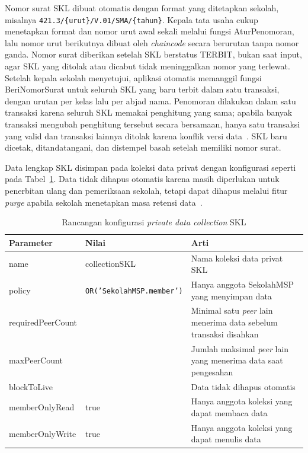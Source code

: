 Nomor surat SKL dibuat otomatis dengan format yang ditetapkan sekolah, misalnya \texttt{421.3/\{urut\}/V.01/SMA/\{tahun\}}. Kepala tata usaha cukup menetapkan format dan nomor urut awal sekali melalui fungsi AturPenomoran, lalu nomor urut berikutnya dibuat oleh \textit{chaincode} secara berurutan tanpa nomor ganda. Nomor surat diberikan setelah SKL berstatus TERBIT, bukan saat input, agar SKL yang ditolak atau dicabut tidak meninggalkan nomor yang terlewat. Setelah kepala sekolah menyetujui, aplikasi otomatis memanggil fungsi BeriNomorSurat untuk seluruh SKL yang baru terbit dalam satu transaksi, dengan urutan per kelas lalu per abjad nama. Penomoran dilakukan dalam satu transaksi karena seluruh SKL memakai penghitung yang sama; apabila banyak transaksi mengubah penghitung tersebut secara bersamaan, hanya satu transaksi yang valid dan transaksi lainnya ditolak karena konflik versi data~\cite{FabricRWSet}. SKL baru dicetak, ditandatangani, dan distempel basah setelah memiliki nomor surat.

Data lengkap SKL disimpan pada koleksi data privat dengan konfigurasi seperti pada Tabel~\ref{table:3.pdc}. Data tidak dihapus otomatis karena masih diperlukan untuk penerbitan ulang dan pemeriksaan sekolah, tetapi dapat dihapus melalui fitur \textit{purge} apabila sekolah menetapkan masa retensi data~\cite{FabricPrivateData}.

\begin{table}[H]
    \centering
    \caption{Rancangan konfigurasi \textit{private data collection} SKL}
    \label{table:3.pdc}
    \footnotesize
    \renewcommand{\arraystretch}{1.25}
    \begin{tabular}{|>{\raggedright\arraybackslash}p{}|>{\raggedright\arraybackslash}p{}|>{\raggedright\arraybackslash}p{}|}
        \hline
        \textbf{Parameter} & \textbf{Nilai} & \textbf{Arti} \\
        \hline
        name & collectionSKL & Nama koleksi data privat SKL \\
        \hline
        policy & \texttt{OR('SekolahMSP.member')} & Hanya anggota SekolahMSP yang menyimpan data \\
        \hline
        requiredPeerCount & 1 & Minimal satu \textit{peer} lain menerima data sebelum transaksi disahkan \\
        \hline
        maxPeerCount & 1 & Jumlah maksimal \textit{peer} lain yang menerima data saat pengesahan \\
        \hline
        blockToLive & 0 & Data tidak dihapus otomatis \\
        \hline
        memberOnlyRead & true & Hanya anggota koleksi yang dapat membaca data \\
        \hline
        memberOnlyWrite & true & Hanya anggota koleksi yang dapat menulis data \\
        \hline
    \end{tabular}
\end{table}

